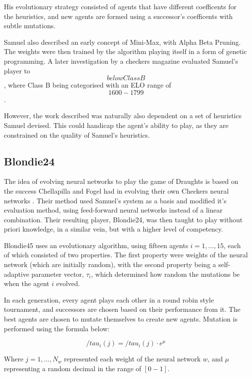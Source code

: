 \documentclass[12pt,a4paper]{article}
\begin{document}
        His evolutionary strategy consisted of agents that have different coefficents for the heuristics, and new agents are formed using a successor's coefficents with subtle mutations.

        Samuel also described an early concept of Mini-Max, with Alpha Beta Pruning. The weights were then trained by the algorithm playing itself in a form of genetic programming. A later investigation by a checkers magazine evaluated Samuel's player to \[below Class B\],\cite{schaeffer_one_1997,fogel_evolving_2000} where Class B being categorised with an ELO range of \[1600-1799\]. 

        However, the work described was naturally also dependent on a set of heuristics Samuel devised. This could handicap the agent's ability to play, as they are constrained on the quality of Samuel's heuristics. 

    \subsection{Blondie24}

        The idea of evolving neural networks to play the game of Draughts is based on the success Chellapilla and Fogel had in evolving their own Checkers neural networks \cite{chellapilla_evolving_1999}. Their method used Samuel's system as a basis and modified it's evaluation method, using feed-forward neural networks instead of a linear combination. Their resulting player, Blondie24, was then taught to play without priori knowledge, in a similar vein, but with a higher level of competency.

        Blondie45 uses an evolutionary algorithm, using fifteen agents $i=1,\dots,15$, each of which consisted of two properties. The first property were weights of the neural network (which are initially random), with the second property being a self-adaptive parameter vector, $\tau_i$, which determined how random the mutations be when the agent $i$ evolved.
        
        In each generation, every agent plays each other in a round robin style tournament, and successors are chosen based on their performance from it. The best agents are chosen to mutate themselves to create new agents. Mutation is performed using the formula below:

        $$
        /tau_i(j) = /tau_i(j) \cdot e^{\mu}
        $$
        
        Where $j=1,...,N_w$ represented each weight of the neural network $w$, and $\mu$ representing a random decimal in the range of $[0-1]$. 
\end{document}
